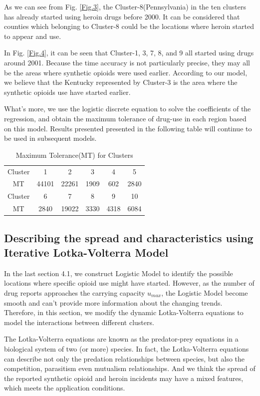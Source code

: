 \documentclass[12pt]{article}
\begin{document}
As we can see from Fig. \ref{Fig.3}, the Cluster-8(Pennsylvania) in the ten clusters has already started using heroin drugs before 2000. It can be considered that counties which belonging to Cluster-8 could be the locations where heroin started to appear and use.

In Fig. \ref{Fig.4}, it can be seen that Cluster-1, 3, 7, 8, and 9 all started using drugs around 2001. Because the time accuracy is not particularly precise, they may all be the areas where synthetic opioids were used earlier. According to our model, we believe that the Kentucky represented by Cluster-3 is the area where the synthetic opioids use have started earlier.

What’s more, we use the logistic discrete equation to solve the coefficients of the regression, and obtain the maximum tolerance of drug-use in each region based on this model. Results presented presented in the following table will continue to be used in subsequent models.
\begin{table}[H]
	\centering
	\caption{Maximum Tolerance(MT) for Clusters}
	\begin{tabular}
	{cccccc}
	\toprule[1pt]
	Cluster	& 1 & 2 & 3 & 4 &5 \\
	MT	& 44101 & 22261 & 1909 & 602 & 2840\\
	\midrule
	Cluster	& 6 & 7 &  8 & 9 & 10 \\
	MT & 2840 & 19022 & 3330 & 4318 & 6084\\
	\bottomrule[1pt]
	\end{tabular}
\end{table}

\subsection{Describing the spread and characteristics using Iterative Lotka-Volterra Model}
In the last section 4.1, we construct Logistic Model to identify the possible locations where specific opioid use might have started. However, as the number of drug reports approaches the carrying capacity $u_{max}$, the Logistic Model become smooth and can’t provide more information about the changing trends. Therefore, in this section, we modify the dynamic Lotka-Volterra equations to model the interactions between different clusters.
	
The Lotka-Volterra equations are known as the predator-prey equations in a biological system of two (or more) species. In fact, the Lotka-Volterra equations can describe not only the predation relationships between species, but also the competition, parasitism even mutualism relationships. And we think the spread of the reported synthetic opioid and heroin incidents may have a mixed features, which meets the application conditions.
\end{document}
